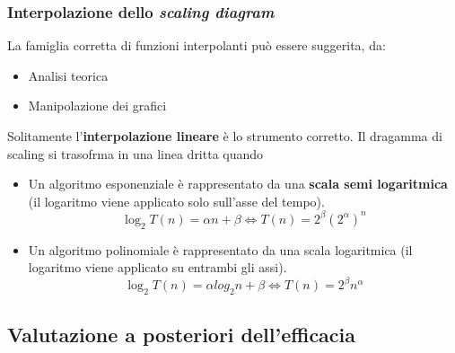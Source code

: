 \documentclass{article}
\begin{document}
\subsubsection{Interpolazione dello \textit{scaling diagram}}
La famiglia corretta di funzioni interpolanti può essere suggerita, da:
\begin{itemize}
    \item Analisi teorica
    \item Manipolazione dei grafici
\end{itemize}
Solitamente l'\textbf{interpolazione lineare} è lo strumento corretto.
Il dragamma di scaling si trasofrma in una linea dritta quando
\begin{itemize}
    \item Un algoritmo esponenziale è rappresentato da una \textbf{scala semi logaritmica} (il logaritmo
          viene applicato solo sull'asse del tempo).
          $$\log_2 T(n)=\alpha n + \beta \Leftrightarrow T(n)=2^\beta(2^\alpha)^n$$

    \item Un algoritmo polinomiale è rappresentato da una scala logaritmica (il logaritmo viene
          applicato su entrambi gli assi).
          $$\log_2 T(n) = \alpha log_2 n + \beta \Leftrightarrow T(n) = 2^\beta n^\alpha$$
\end{itemize}

\subsection{Valutazione a posteriori dell'efficacia}
\end{document}
